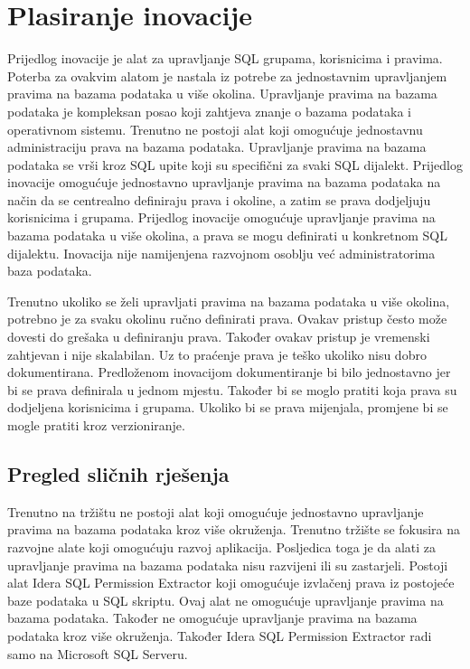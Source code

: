 \chapter{Plasiranje inovacije} \label{plasiranje_inovacije}

Prijedlog inovacije je alat za upravljanje SQL grupama, korisnicima i pravima.
Poterba za ovakvim alatom je nastala iz potrebe za jednostavnim upravljanjem
pravima na bazama podataka u više okolina. Upravljanje pravima na bazama
podataka je kompleksan posao koji zahtjeva znanje o bazama podataka i
operativnom sistemu. Trenutno ne postoji alat koji omogućuje jednostavnu
administraciju prava na bazama podataka. Upravljanje pravima na bazama podataka
se vrši kroz SQL upite koji su specifični za svaki SQL dijalekt. Prijedlog
inovacije omogućuje jednostavno upravljanje pravima na bazama podataka na način
da se centrealno definiraju prava i okoline, a zatim se prava dodjeljuju
korisnicima i grupama. Prijedlog inovacije omogućuje upravljanje pravima na
bazama podataka u više okolina, a prava se mogu definirati u konkretnom SQL
dijalektu. Inovacija nije namijenjena razvojnom osoblju već administratorima
baza podataka.

Trenutno ukoliko se želi upravljati pravima na bazama podataka u više okolina,
potrebno je za svaku okolinu ručno definirati prava. Ovakav pristup često može
dovesti do grešaka u definiranju prava. Također ovakav pristup je vremenski
zahtjevan i nije skalabilan. Uz to praćenje prava je teško ukoliko nisu dobro
dokumentirana. Predloženom inovacijom dokumentiranje bi bilo jednostavno jer bi
se prava definirala u jednom mjestu. Također bi se moglo pratiti koja prava su
dodjeljena korisnicima i grupama. Ukoliko bi se prava mijenjala, promjene bi se
mogle pratiti kroz verzioniranje.

\section{Pregled sličnih rješenja} \label{pregled_slicnih_rjesenja}

Trenutno na tržištu ne postoji alat koji omogućuje jednostavno upravljanje
pravima na bazama podataka kroz više okruženja. Trenutno tržište se fokusira na
razvojne alate koji omogućuju razvoj aplikacija. Posljedica toga je da alati za
upravljanje pravima na bazama podataka nisu razvijeni ili su zastarjeli. Postoji
alat Idera SQL Permission Extractor \citep{idera} koji omogućuje izvlačenj prava
iz postojeće baze podataka u SQL skriptu. Ovaj alat ne omogućuje upravljanje
pravima na bazama podataka. Također ne omogućuje upravljanje pravima na bazama
podataka kroz više okruženja. Također Idera SQL Permission Extractor radi samo
na Microsoft SQL Serveru. 

